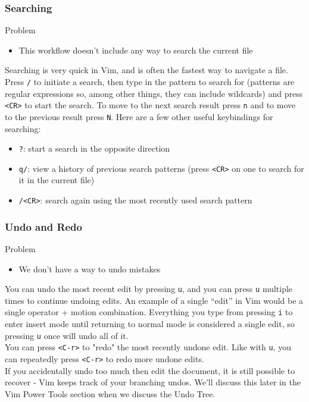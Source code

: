 \documentclass{beamer}
\begin{document}
\begin{frame}[fragile]
    \frametitle{Searching}
    \begin{block}{Problem}
	\begin{itemize}
	    \item This workflow doesn't include any way to search the current file
	\end{itemize}
    \end{block}
    Searching is very quick in Vim, and is often the fastest way to navigate a file. Press \verb+/+ to initiate a search, then type in the pattern to search for (patterns are regular expressions so, among other things, they can include wildcards) and press \verb+<CR>+ to start the search. To move to the next search result press \verb+n+ and to move to the previous result press \verb+N+. Here are a few other useful keybindings for searching:
    \begin{itemize}
	\item \verb+?+: start a search in the opposite direction
	\item \verb+q/+: view a history of previous search patterns (press \verb+<CR>+ on one to search for it in the current file)
	\item \verb+/<CR>+: search again using the most recently used search pattern
    \end{itemize}
\end{frame}

\begin{frame}[fragile]
    \frametitle{Undo and Redo}
    \begin{block}{Problem}
	\begin{itemize}
	    \item We don't have a way to undo mistakes
	\end{itemize}
    \end{block}
    You can undo the most recent edit by pressing \verb+u+, and you can press \verb+u+ multiple times to continue undoing edits. An example of a single \enquote{edit} in Vim would be a single operator + motion combination. Everything you type from pressing \verb+i+ to enter insert mode until returning to normal mode is considered a single edit, so pressing \verb+u+ once will undo all of it.\\
    \vspace{0.5cm}
    You can press \verb+<C-r>+ to "redo" the most recently undone edit. Like with \verb+u+, you can repeatedly press \verb+<C-r>+ to redo more undone edits.\\
    \vspace{0.5cm}
    If you accidentally undo too much then edit the document, it is still possible to recover - Vim keeps track of your branching undos. We'll discuss this later in the Vim Power Tools section when we discuss the Undo Tree.
\end{frame}
\end{document}
